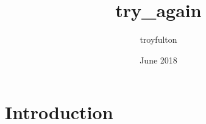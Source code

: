 \documentclass{article}
\title{try_again}
\author{troyfulton }
\date{June 2018}
\begin{document}
\maketitle

\section{Introduction}
\end{document}
